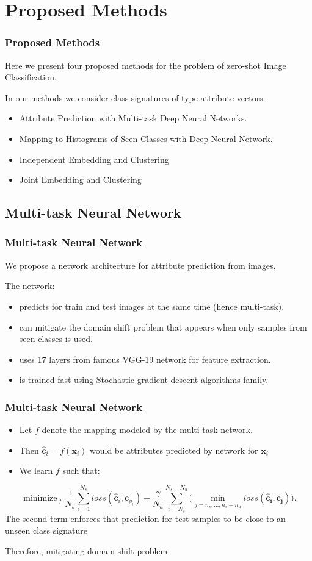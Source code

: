 \documentclass{beamer}
\DeclareMathOperator*{\minimize}{minimize\,}
\begin{document}
\section{Proposed Methods}
\begin{frame}\frametitle{Proposed Methods}
Here we present four proposed methods for the problem of zero-shot Image Classification.

In our methods we consider class signatures of type attribute vectors.

\begin{itemize}
  \item Attribute Prediction with Multi-task Deep Neural Networks.
  \item Mapping to Histograms of Seen Classes with Deep Neural Network.
  \item Independent Embedding and Clustering
  \item Joint Embedding and Clustering
\end{itemize}
\end{frame}

\subsection{Multi-task Neural Network}
\begin{frame}\frametitle{Multi-task Neural Network}
  We propose a network architecture for attribute prediction from images.

  The network:
\begin{itemize}
  \item  predicts for train and test images at the same time (hence multi-task).
  \item can mitigate the domain shift problem that appears when only samples from seen classes is used.
  \item uses 17 layers from famous VGG-19 network \cite{vgg}  for feature extraction.
  \item is trained fast using Stochastic gradient descent algorithms family.
\end{itemize}
\end{frame}

\begin{frame}\frametitle{Multi-task Neural Network}
\begin{itemize}
\item[] Let $f$ denote the mapping modeled by the multi-task network.
\item[] Then  $\mathbf{\hat{c}}_i = f (\mathbf{x}_i) $ would be attributes predicted by network for $\mathbf{x}_i$
\item[] We learn $f$ such that:
\end{itemize}
  \begin{equation}
\label{eq:nn_loss}
\minimize_{f}
\frac{1}{N_s} \sum_{i=1}^{N_s} loss(\mathbf{\hat{c}}_i, \mathbf{c}_{y_i}) +
\frac{\gamma}{N_u} \sum_{i=N_s}^{N_s+N_u} \Big ( \min_{j=n_s,\ldots,n_s + n_u} loss(\mathbf{\hat{c}_i , c_j}) \Big ).
\end{equation}
The second term enforces that prediction for test samples to be close to an unseen class signature

Therefore, mitigating domain-shift problem
\end{frame}
\end{document}
